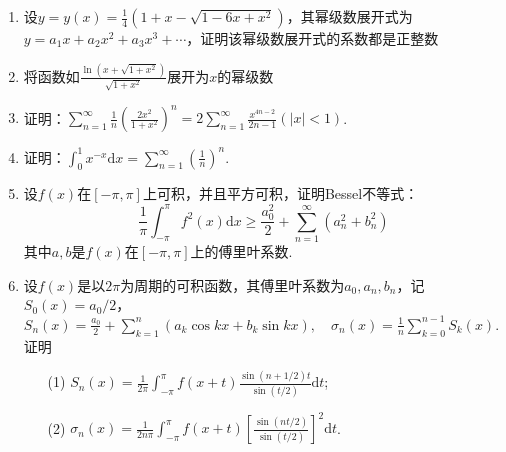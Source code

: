 \begin{enumerate}
	\item 设$y=y(x)=\frac{1}{4}\left(1+x-\sqrt{1-6 x+x^{2}}\right)$，其幂级数展开式为$y=a_{1} x+a_{2} x^{2}+a_{3} x^{3}+\cdots$，证明该幂级数展开式的系数都是正整数
	\item 将函数如$\frac{\ln \left(x+\sqrt{1+x^{2}}\right)}{\sqrt{1+x^{2}}}$展开为$x$的幂级数
	\item 证明：$\sum_{n=1}^{\infty} \frac{1}{n}\left(\frac{2 x^{2}}{1+x^{2}}\right)^{n}=2 \sum_{n=1}^{\infty} \frac{x^{4 n-2}}{2 n-1}(|x|<1)$.
	\item 证明：$\int_{0}^{1} x^{-x} \mathrm{d} x=\sum_{n=1}^{\infty}\left(\frac{1}{n}\right)^{n}$.
	\item 设$f(x)$在$[-\pi,\pi]$上可积，并且平方可积，证明Bessel不等式：
	\[\frac{1}{\pi} \int_{-\pi}^{\pi} f^{2}(x) \mathrm{d} x \geqslant \frac{a_{0}^{2}}{2}+\sum_{n=1}^{\infty}\left(a_{n}^{2}+b_{n}^{2}\right)\]
	其中$a,b$是$f(x)$在$[-\pi,\pi]$上的傅里叶系数.
	\item 设$f(x)$是以$2\pi$为周期的可积函数，其傅里叶系数为$a_{0}, a_{n}, b_{n}$，记$S_{0}(x)=a_{0} / 2$，$S_{n}(x)=\frac{a_{0}}{2}+\sum_{k=1}^{n}\left(a_{k} \cos k x+b_{k} \sin k x\right), \quad \sigma_{n}(x)=\frac{1}{n} \sum_{k=0}^{n-1} S_{k}(x)$.证明
	\begin{enumerate}
		\item [(1)]$S_{n}(x)=\frac{1}{2 \pi} \int_{-\pi}^{\pi} f(x+t) \frac{\sin (n+1 / 2) t}{\sin (t / 2)} \mathrm{d} t$;
		\item [(2)]$\sigma_{n}(x)=\frac{1}{2 n \pi} \int_{-\pi}^{\pi} f(x+t)\left[\frac{\sin (n t / 2)}{\sin (t / 2)}\right]^{2} \mathrm{d} t$.
	\end{enumerate}
\end{enumerate}